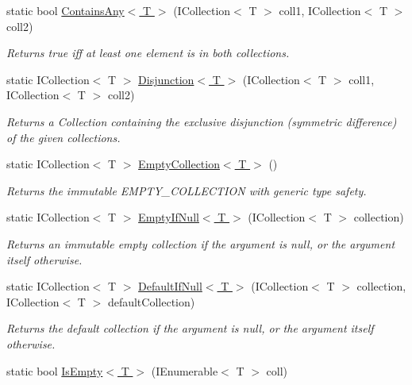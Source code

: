 \begin{DoxyCompactItemize}
static bool \hyperlink{class_ultimate_1_1_utilities_1_1_collection_utils_a766817b1d4b80bb5826b627e28dcabba}{Contains\+Any$<$ T $>$} (I\+Collection$<$ T $>$ coll1, I\+Collection$<$ T $>$ coll2)
\begin{DoxyCompactList}\small\item\em Returns true iff at least one element is in both collections. \end{DoxyCompactList}\item 
static I\+Collection$<$ T $>$ \hyperlink{class_ultimate_1_1_utilities_1_1_collection_utils_aedefefd2efb016052ab68848610cc3ae}{Disjunction$<$ T $>$} (I\+Collection$<$ T $>$ coll1, I\+Collection$<$ T $>$ coll2)
\begin{DoxyCompactList}\small\item\em Returns a Collection containing the exclusive disjunction (symmetric difference) of the given collections. \end{DoxyCompactList}\item 
static I\+Collection$<$ T $>$ \hyperlink{class_ultimate_1_1_utilities_1_1_collection_utils_a897ec78b25bad5bc13013ee73c0b6f25}{Empty\+Collection$<$ T $>$} ()
\begin{DoxyCompactList}\small\item\em Returns the immutable E\+M\+P\+T\+Y\+\_\+\+C\+O\+L\+L\+E\+C\+T\+I\+ON with generic type safety. \end{DoxyCompactList}\item 
static I\+Collection$<$ T $>$ \hyperlink{class_ultimate_1_1_utilities_1_1_collection_utils_a012ddee798cd6a0d5dd6cf6dc2085521}{Empty\+If\+Null$<$ T $>$} (I\+Collection$<$ T $>$ collection)
\begin{DoxyCompactList}\small\item\em Returns an immutable empty collection if the argument is null, or the argument itself otherwise. \end{DoxyCompactList}\item 
static I\+Collection$<$ T $>$ \hyperlink{class_ultimate_1_1_utilities_1_1_collection_utils_abd48d9de9b2fb2fff48fe109580a2658}{Default\+If\+Null$<$ T $>$} (I\+Collection$<$ T $>$ collection, I\+Collection$<$ T $>$ default\+Collection)
\begin{DoxyCompactList}\small\item\em Returns the default collection if the argument is null, or the argument itself otherwise. \end{DoxyCompactList}\item 
static bool \hyperlink{class_ultimate_1_1_utilities_1_1_collection_utils_a1a1513b7a75c9a8c87327e0b401945e4}{Is\+Empty$<$ T $>$} (I\+Enumerable$<$ T $>$ coll)

\end{DoxyCompactItemize}
